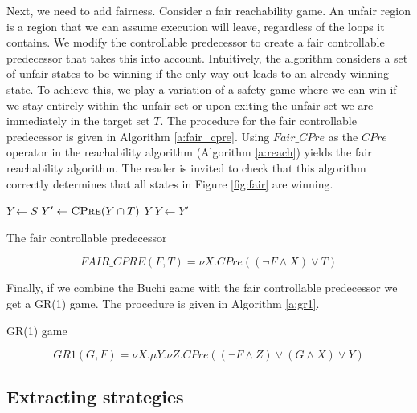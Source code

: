 Next, we need to add fairness. Consider a fair reachability game. An unfair region is a region that we can assume execution will leave, regardless of the loops it contains. We modify the controllable predecessor to create a fair controllable predecessor that takes this into account. Intuitively, the algorithm considers a set of unfair states to be winning if the only way out leads to an already winning state. To achieve this, we play a variation of a safety game where we can win if we stay entirely within the unfair set or upon exiting the unfair set we are immediately in the target set $T$. The procedure for the fair controllable predecessor is given in Algorithm \ref{a:fair_cpre}. Using $Fair\_CPre$ as the $CPre$ operator in the reachability algorithm (Algorithm \ref{a:reach}) yields the fair reachability algorithm. The reader is invited to check that this algorithm correctly determines that all states in Figure \ref{fig:fair} are winning.

\begin{algorithm}[t]
\begin{algorithmic}
\State $Y \gets S$
\Loop
\State $Y' \gets \Call{CPre}{Y \cap T}$
\State\Return $Y$\EndIf
\State $Y \gets Y'$
\EndLoop
\EndFunction
\end{algorithmic}
\caption{The fair controllable predecessor}
\label{a:fair_cpre}
\end{algorithm}

\begin{equation}
FAIR\_CPRE(F, T) = \nu X. CPre((\neg F \wedge X) \vee T)
\label{eqn:mu_fair}
\end{equation}

Finally, if we combine the Buchi game with the fair controllable predecessor we get a GR(1) game. The procedure is given in Algorithm \ref{a:gr1}.

\begin{algorithm}[t]
\begin{algorithmic}
\State\Return {}
\EndFunction
\end{algorithmic}
\caption{GR(1) game}
\label{a:gr1}
\end{algorithm}

\begin{equation}
GR1(G, F) = \nu X. \mu Y. \nu Z. CPre((\neg F \wedge Z) \vee (G \wedge X) \vee Y)
\label{equ:mu_gr1}
\end{equation}

\subsection{Extracting strategies}

